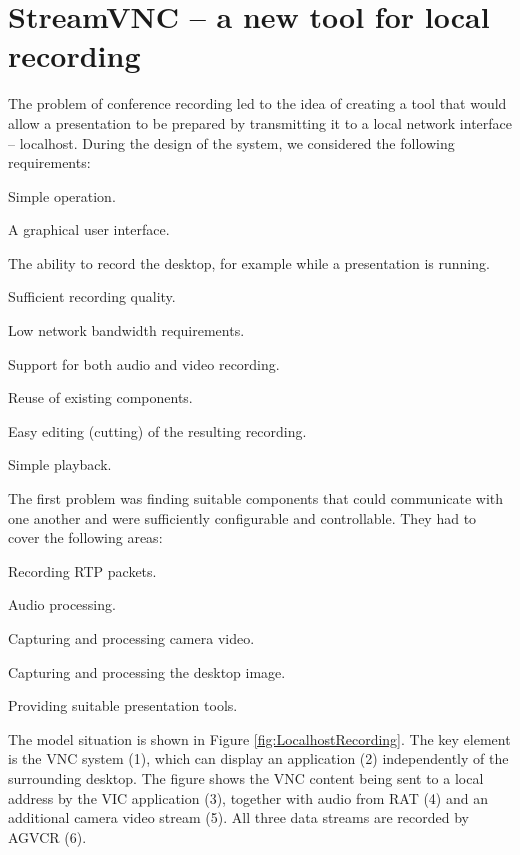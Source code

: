 \section{StreamVNC -- a new tool for local recording}

The problem of conference recording led to the idea of creating a tool that would allow a presentation to be prepared by transmitting it to a local network interface -- localhost. During the design of the system, we considered the following requirements:
\begin{paklist}
\item Simple operation.
\item A graphical user interface.
\item The ability to record the desktop, for example while a presentation is running.
\item Sufficient recording quality.
\item Low network bandwidth requirements.
\item Support for both audio and video recording.
\item Reuse of existing components.
\item Easy editing (cutting) of the resulting recording.
\item Simple playback.
\end{paklist}

The first problem was finding suitable components that could communicate with one another and were sufficiently configurable and controllable. They had to cover the following areas:
\begin{paklist}
\item Recording RTP packets.
\item Audio processing.
\item Capturing and processing camera video.
\item Capturing and processing the desktop image.
\item Providing suitable presentation tools.
\end{paklist}

The model situation is shown in Figure \ref{fig:LocalhostRecording}. The key element is the VNC system (1), which can display an application (2) independently of the surrounding desktop. The figure shows the VNC content being sent to a local address by the VIC application (3), together with audio from RAT (4) and an additional camera video stream (5). All three data streams are recorded by AGVCR (6).

